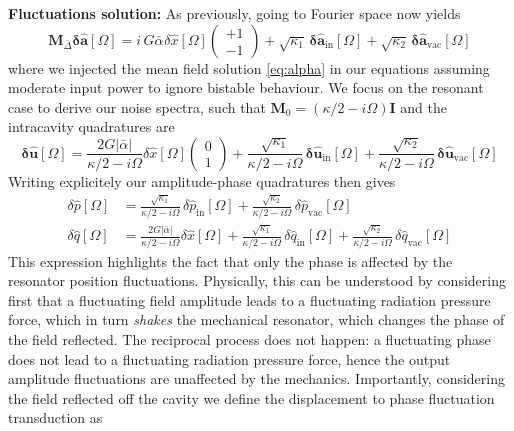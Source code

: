 \noindent \textbf{Fluctuations solution:} As previously, going to Fourier space now yields 
\begin{equation}
     \mathbf{M}_{\bar\Delta} \mathbf{\delta \hat{a}}[\Omega]  = i \,  G \bar{\alpha}_{\mathrm{}} \delta \hat{x}[\Omega]   \begin{pmatrix} +1 \\ -1\end{pmatrix}  +\sqrt{\kappa_{\mathrm{1}}} \, \mathbf{\delta \hat{a}_{\mathrm{in}}}[\Omega]  + \sqrt{\kappa_2} \, \mathbf{\delta \hat{a}_{\mathrm{vac}}}[\Omega] 
\end{equation}
where we injected the mean field solution \eqref{eq:alpha} in our equations assuming moderate input power to ignore bistable behaviour. We focus on the resonant case to derive our noise spectra, such that $\mathbf{M}_0 = (\kappa/2 - i\Omega) \mathbf{I}$  and the intracavity quadratures are
\begin{equation}
  \mathbf{\delta \hat{u}}[\Omega] =  \frac{2G|\bar \alpha|}{\kappa/2 - i\Omega}\delta \hat{x}[\Omega] \begin{pmatrix} 0\\ 1\end{pmatrix}  +\frac{\sqrt{\kappa_{\mathrm{1}}}}{\kappa/2 - i\Omega} \, \mathbf{\delta \hat{u}_{\mathrm{in}}}[\Omega]  +\frac{\sqrt{\kappa_{\mathrm{2}}}}{\kappa/2 - i\Omega} \, \mathbf{\delta \hat{u}_{\mathrm{vac}}}[\Omega]  
\end{equation}
Writing explicitely our amplitude-phase quadratures then gives 
\begin{equation}
  \begin{split}
    \delta \hat{p}[\Omega] &= \frac{\sqrt{\kappa_{\mathrm{1}}}}{\kappa/2 - i\Omega} \, \delta \hat{p}_{\mathrm{in}}[\Omega] + \frac{\sqrt{\kappa_{\mathrm{2}}}}{\kappa/2 - i\Omega} \, \delta \hat{p}_{\mathrm{vac}}[\Omega] \\
    \delta \hat{q}[\Omega] &=  \frac{2G|\bar \alpha|}{\kappa/2 - i\Omega}\delta \hat{x}[\Omega]  +\frac{\sqrt{\kappa_{\mathrm{1}}}}{\kappa/2 - i\Omega} \, \delta \hat{q}_{\mathrm{in}}[\Omega]  + \frac{\sqrt{\kappa_{\mathrm{2}}}}{\kappa/2 - i\Omega} \, \delta \hat{q}_{\mathrm{vac}}[\Omega] 
  \end{split}
   \label{eq:intra_quad}
\end{equation}
This expression highlights the fact that only the phase is affected by the resonator position fluctuations. Physically, this can be understood by considering first that a fluctuating field amplitude leads to a fluctuating radiation pressure force, which in turn \textit{shakes} the mechanical resonator, which changes the phase of the field reflected. The reciprocal process does not happen: a fluctuating phase does not lead to a fluctuating radiation pressure force, hence the output amplitude fluctuations are unaffected by the mechanics. Importantly, considering the field reflected off the cavity we define the displacement to phase fluctuation transduction as
